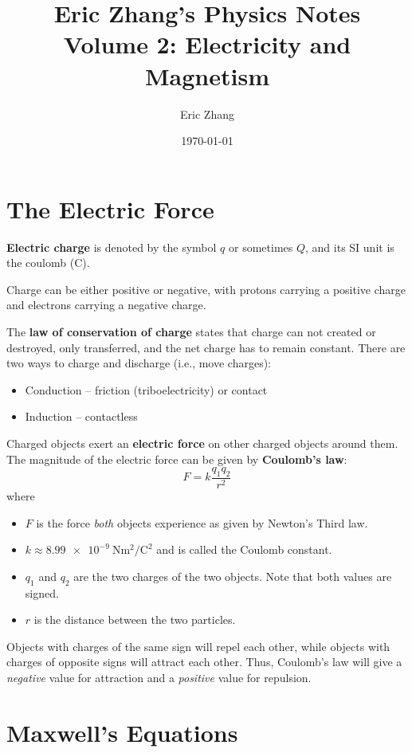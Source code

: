 \documentclass[a4paper, titlepage]{book}
\title{
    Eric Zhang's Physics Notes \\
    \large Volume 2: Electricity and Magnetism
}
\author{Eric Zhang}
\date{\today}
\begin{document}
\frontmatter
\maketitle
\tableofcontents


\mainmatter

\chapter{The Electric Force}

\textbf{Electric charge} is denoted by the symbol \(q\) or sometimes \(Q\),
and its SI unit is the coulomb (C).

Charge can be either positive or negative,
with protons carrying a positive charge and electrons carrying a negative charge.

The \textbf{law of conservation of  charge} states that charge can not created or destroyed,
only transferred,
and the net charge has to remain constant.
There are two ways to charge and discharge (i.e., move charges):
\begin{itemize}
    \item Conduction -- friction (triboelectricity) or contact
    \item Induction -- contactless
\end{itemize}

Charged objects exert an \textbf{electric force} on other charged objects around them.
The magnitude of the electric force can be given by \textbf{Coulomb's law}:
\begin{equation}
    F = k\frac{q_1 q_2}{r^2}
\end{equation}
where
\begin{itemize}
    \item \(F\) is the force \emph{both} objects experience as given by Newton's Third law.
    \item \(k \approx \qty{8.99e-9}{\newton \meter\squared \per \coulomb\squared}\)
          and is called the Coulomb constant.
    \item \(q_1\) and \(q_2\) are the two charges of the two objects.
          Note that both values are signed.
    \item \(r\) is the distance between the two particles.
\end{itemize}
Objects with charges of the same sign will repel each other,
while objects with charges of opposite signs will attract each other.
Thus, Coulomb's law will give a \emph{negative} value for attraction
and a \emph{positive} value for repulsion.


\chapter{Maxwell's Equations}


\appendix





\backmatter
\printbibliography[title={References}]
\end{document}
